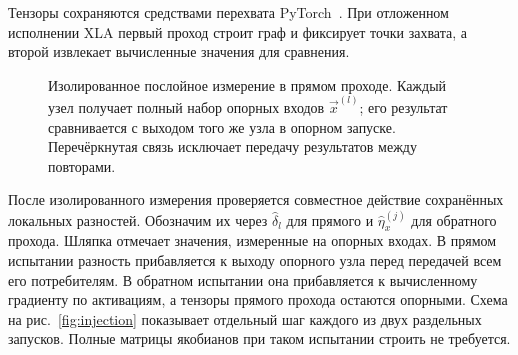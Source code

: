Тензоры сохраняются средствами перехвата PyTorch~\cite{Paszke2019}.
При отложенном исполнении XLA первый проход строит граф и фиксирует
точки захвата, а второй извлекает вычисленные значения для сравнения.


\begin{figure}[htbp]
    \centering
    \caption{Изолированное послойное измерение в прямом проходе.
        Каждый узел получает полный набор опорных входов $\Vec{x}^{(l)}$;
        его результат сравнивается с выходом того же узла в опорном запуске.
        Перечёркнутая связь исключает передачу результатов между повторами.}
    \label{fig:replay}
\end{figure}

После изолированного измерения проверяется совместное действие
сохранённых локальных разностей. Обозначим их через
$\widehat\delta_l$ для прямого и $\widehat\eta_x^{(j)}$ для обратного
прохода. Шляпка отмечает значения, измеренные на опорных входах.
В прямом испытании разность прибавляется к выходу опорного узла перед
передачей всем его потребителям. В обратном испытании она прибавляется
к вычисленному градиенту по активациям, а тензоры прямого прохода
остаются опорными. Схема на рис.~\ref{fig:injection} показывает
отдельный шаг каждого из двух раздельных запусков.
Полные матрицы якобианов при таком испытании строить не требуется.

